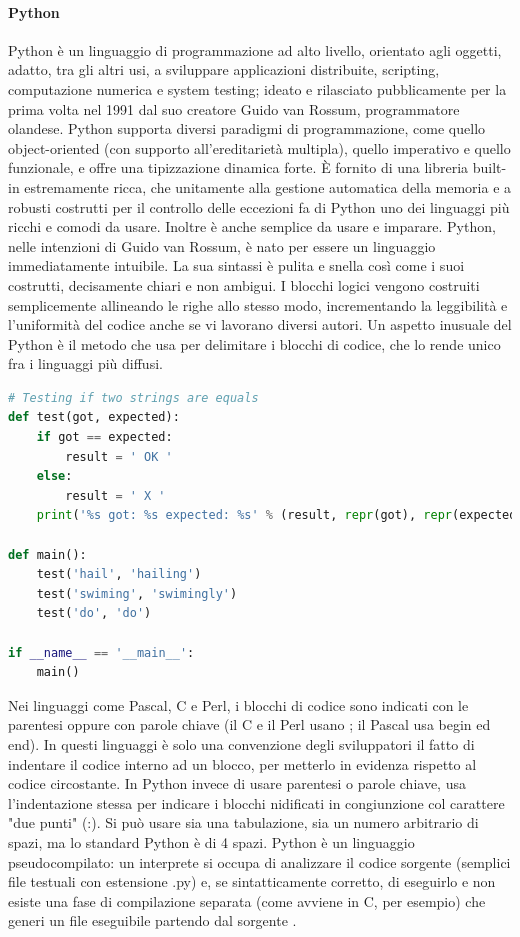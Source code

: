 \paragraph{Python}
Python è un linguaggio di programmazione ad alto livello, orientato agli oggetti, adatto, tra gli altri usi, a sviluppare applicazioni 
distribuite, scripting, computazione numerica e system testing; ideato e rilasciato pubblicamente per la prima volta nel 1991 dal suo 
creatore Guido van Rossum, programmatore olandese.\hfill\break
Python supporta diversi paradigmi di programmazione, come quello object-oriented (con supporto all'ereditarietà multipla), quello 
imperativo e quello funzionale, e offre una tipizzazione dinamica forte. È fornito di una libreria built-in estremamente ricca, che 
unitamente alla gestione automatica della memoria e a robusti costrutti per il controllo delle eccezioni fa di Python uno dei linguaggi 
più ricchi e comodi da usare.
Inoltre è anche semplice da usare e imparare. Python, nelle intenzioni di Guido van Rossum, è nato per essere un linguaggio 
immediatamente intuibile. La sua sintassi è pulita e snella così come i suoi costrutti, decisamente chiari e non ambigui. I blocchi 
logici vengono costruiti semplicemente allineando le righe allo stesso modo, incrementando la leggibilità e l'uniformità del codice 
anche se vi lavorano diversi autori.\hfill\break
Un aspetto inusuale del Python è il metodo che usa per delimitare i blocchi di codice, che lo rende unico fra i linguaggi più diffusi.
%
\lstset{style=python_code_style}
\begin{lstlisting}[language=Python, caption={Esempio di programma scritto in Python}]
# Testing if two strings are equals
def test(got, expected):
    if got == expected:
        result = ' OK '
    else:
        result = ' X '
    print('%s got: %s expected: %s' % (result, repr(got), repr(expected)))

def main():
    test('hail', 'hailing')
    test('swiming', 'swimingly')
    test('do', 'do')

if __name__ == '__main__':
    main()
\end{lstlisting}
%
Nei linguaggi come Pascal, C e Perl, i blocchi di codice sono indicati con le parentesi oppure con parole chiave 
(il C e il Perl usano { }; il Pascal usa begin ed end). In questi linguaggi è solo una convenzione degli sviluppatori il fatto di 
indentare il codice interno ad un blocco, per metterlo in evidenza rispetto al codice circostante. In Python invece di usare parentesi 
o parole chiave, usa l'indentazione stessa per indicare i blocchi nidificati in congiunzione col carattere "due punti" (:). Si può usare 
sia una tabulazione, sia un numero arbitrario di spazi, ma lo standard Python è di 4 spazi.
Python è un linguaggio pseudocompilato: un interprete si occupa di analizzare il codice sorgente (semplici file testuali con 
estensione .py) e, se sintatticamente corretto, di eseguirlo e non esiste una fase di compilazione separata (come 
avviene in C, per esempio) che generi un file eseguibile partendo dal sorgente \cite{python-documentation}.
%
